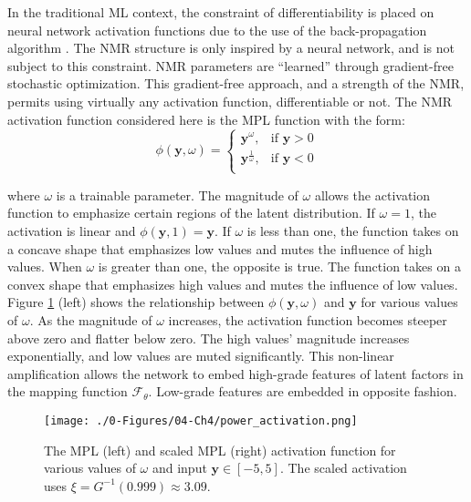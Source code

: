 In the traditional \gls{ML} context, the constraint of differentiability is placed on neural network activation functions due to the use of the back-propagation algorithm \citep{rojas1996backpropagation}. The \gls{NMR} structure is only inspired by a neural network, and is not subject to this constraint. \Gls{NMR} parameters are ``learned'' through gradient-free stochastic optimization. This gradient-free approach, and a strength of the \gls{NMR}, permits using virtually any activation function, differentiable or not. The \gls{NMR} activation function considered here is the \acrfull{MPL} function with the form:
\begin{equation}
    \phi \left( \mathbf{y}, \omega \right) =
    \begin{cases}
        \mathbf{y}^{\omega},           & \text{if $\mathbf{y} > 0$} \\
        \mathbf{y}^{\frac{1}{\omega}}, & \text{if $\mathbf{y} < 0$} \\
    \end{cases}
    \label{eq:power}
\end{equation}


\lowercase{Where} $\omega$ is a trainable parameter. The magnitude of $\omega$ allows the activation function to emphasize certain regions of the latent distribution. If $\omega = 1$, the activation is linear and $\phi \left( \mathbf{y}, 1 \right)=\mathbf{y}$. If $\omega$ is less than one, the function takes on a concave shape that emphasizes low values and mutes the influence of high values. When $\omega$ is greater than one, the opposite is true. The function takes on a convex shape that emphasizes high values and mutes the influence of low values. Figure \ref{fig:power_activation} (left) shows the relationship between $\phi \left( \mathbf{y}, \omega \right)$ and $\mathbf{y}$ for various values of $\omega$. As the magnitude of $\omega$ increases, the activation function becomes steeper above zero and flatter below zero. The high values' magnitude increases exponentially, and low values are muted significantly. This non-linear amplification allows the network to embed high-grade features of latent factors in the mapping function $\mathcal{F}_{\theta}$. Low-grade features are embedded in opposite fashion.

\begin{figure}[htb!]
    \centering
    \texttt{[image: ./0-Figures/04-Ch4/power\_activation.png]}
    \caption{The \gls{MPL} (left) and scaled \gls{MPL} (right) activation function for various values of $\omega$ and input $\mathbf{y} \in [-5,5]$. The scaled activation uses $\xi = G^{-1}(0.999) \approx 3.09$. }
    \label{fig:power_activation}
\end{figure}

